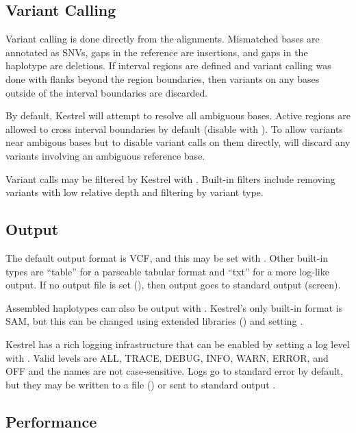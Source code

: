 \subsection{Variant Calling}
\label{sec.process.varcall}

Variant calling is done directly from the alignments. Mismatched bases are annotated as SNVs, gaps in the reference are insertions, and gaps in the haplotype are deletions. If interval regions are defined and variant calling was done with flanks beyond the region boundaries, then variants on any bases outside of the interval boundaries are discarded.

By default, Kestrel will attempt to resolve all ambiguous bases. Active regions are allowed to cross interval boundaries by default (disable with ). To allow variants near ambigous bases but to disable variant calls on them directly,  will discard any variants involving an ambiguous reference base.

Variant calls may be filtered by Kestrel with . Built-in filters include removing variants with low relative depth and filtering by variant type.


\subsection{Output}
\label{sec.process.output}

The default output format is VCF, and this may be set with . Other built-in types are ``table'' for a parseable tabular format and ``txt'' for a more log-like output. If no output file is set (), then output goes to standard output (screen).

Assembled haplotypes can also be output with . Kestrel's only built-in format is SAM, but this can be changed using extended libraries () and setting .

Kestrel has a rich logging infrastructure that can be enabled by setting a log level with . Valid levels are ALL, TRACE, DEBUG, INFO, WARN, ERROR, and OFF and the names are not case-sensitive. Logs go to standard error by default, but they may be written to a file () or sent to standard output .

\subsection{Performance}
\label{sec.process.perf}

